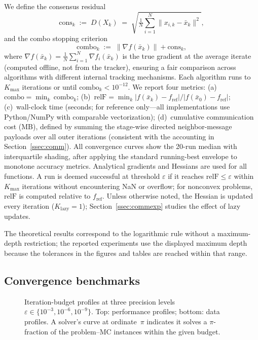\documentclass[review,onefignum,onetabnum]{siamart171218}
\begin{document}
	We define the consensus residual
	\[
	\mathrm{cons}_k
	\;:=\;
	D(X_k)
	\;=\;
	\sqrt{\tfrac{1}{N}\textstyle\sum_{i=1}^{N}\|x_{i,k}-\bar x_k\|^{2}},
	\]
	and the combo stopping criterion
	\[
	\mathrm{combo}_k
	\;:=\;
	\|\nabla f(\bar x_k)\| + \mathrm{cons}_k,
	\]
	where $\nabla f(\bar x_k)=\frac{1}{N}\sum_{i=1}^N\nabla f_i(\bar x_k)$
	is the true gradient at the average iterate (computed offline,
	not from the tracker), ensuring a fair comparison across algorithms
	with different internal tracking mechanisms.
	Each algorithm runs to $K_{\max}$ iterations or until
	$\mathrm{combo}_k < 10^{-12}$.
	We report four metrics:
	(a)~$\mathrm{combo}=\min_k\,\mathrm{combo}_k$;
	(b)~$\mathrm{relF}=\min_k |f(\bar x_k)-f_{\mathrm{ref}}|/|f(\bar x_0)-f_{\mathrm{ref}}|$;
	(c)~wall-clock time (seconds; for reference only---all implementations
	use Python/NumPy with comparable vectorization);
	(d)~cumulative communication cost (MB), defined by summing the
	stage-wise directed neighbor-message payloads over all outer iterations
	(consistent with the accounting in Section~\ref{ssec:comm}).
	All convergence curves show the 20-run median with interquartile
	shading, after applying the standard running-best envelope to monotone
	accuracy metrics.
	Analytical gradients and Hessians are used for all functions.
	A run is deemed successful at threshold $\varepsilon$ if it reaches
	$\mathrm{relF}\le\varepsilon$ within $K_{\max}$ iterations without
	encountering NaN or overflow; for nonconvex problems, $\mathrm{relF}$ is
	computed relative to $f_{\mathrm{ref}}$.
	Unless otherwise noted, the Hessian is updated every iteration
	($K_{\mathrm{lazy}}{=}1$); Section~\ref{ssec:commexp} studies the
	effect of lazy updates.
	
	The theoretical results correspond to the logarithmic rule without a
	maximum-depth restriction; the reported experiments use the displayed
	maximum depth because the
	tolerances in the figures and tables are reached within that range.
	
	\FloatBarrier
	\subsection{Convergence benchmarks}\label{ssec:convergence}
	
	
	\begin{figure}[htbp]
		\centering
		\caption{Iteration-budget profiles at three precision levels
			$\varepsilon\in\{10^{-3},10^{-6},10^{-9}\}$.
			Top: performance profiles; bottom: data profiles.
			A solver's curve at ordinate~$\pi$ indicates it solves a
			$\pi$-fraction of the problem--MC instances within the given budget.}
		\label{fig:profiles}
	\end{figure}
	
\end{document}
